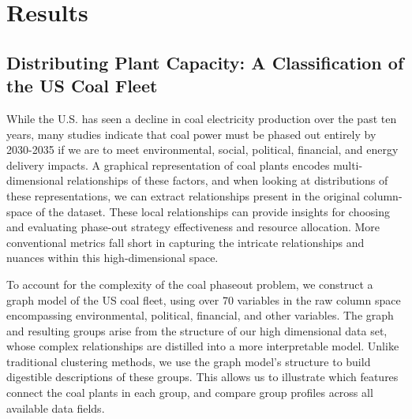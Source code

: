 \section{Results}

\subsection{Distributing Plant Capacity: A Classification of the US Coal Fleet}

While the U.S. has seen a decline in coal electricity production over the past ten years, many studies indicate that coal power must be phased out entirely 
by 2030-2035 if we are to meet environmental, social, political, financial, and energy delivery impacts. A graphical representation of coal plants encodes 
multi-dimensional relationships of these factors, and when looking at distributions of these representations, we can extract relationships present in the original 
column-space of the dataset. These local relationships can provide insights for choosing and evaluating phase-out strategy effectiveness and resource allocation. 
More conventional metrics fall short in capturing the intricate relationships and nuances within this high-dimensional space.

To account for the complexity of the coal phaseout problem, we construct a graph model of the US coal fleet, using over 70 variables in the raw column space 
encompassing environmental, political, financial, and other variables. The graph and resulting groups arise from the structure of our high dimensional data set, 
whose complex relationships are distilled into a more interpretable model. Unlike traditional clustering methods, we use the graph model’s structure to build 
digestible descriptions of these groups. This allows us to illustrate which features connect the coal plants in each group, and compare group profiles across all 
available data fields.

\vspace{\baselineskip}


